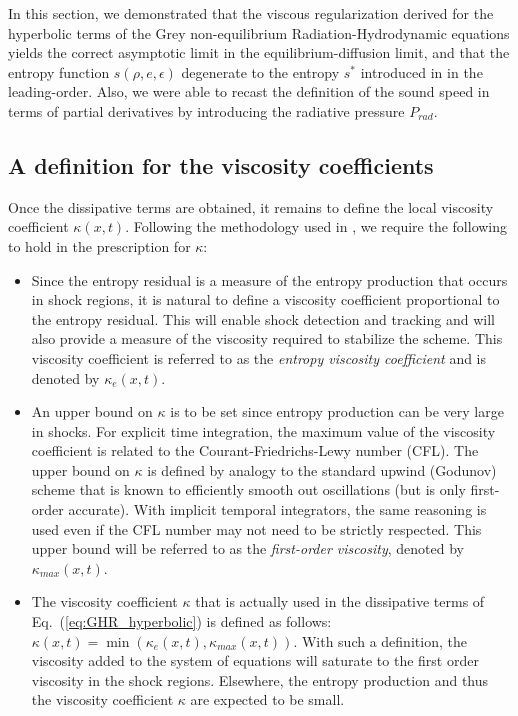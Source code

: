 \documentclass[review]{elsarticle}
\newcommand{\eqt}[1]{Eq.~(\ref{#1})}                     %
\begin{document}
In this section, we demonstrated that the viscous regularization derived for the hyperbolic terms of the Grey non-equilibrium Radiation-Hydrodynamic equations yields the correct asymptotic limit in the equilibrium-diffusion limit, and that the entropy function $s(\rho, e, \epsilon)$ degenerate to the entropy $s^*$ introduced in \cite{LowrieMorel} in the leading-order. Also, we were able to recast the definition of the sound speed in terms of partial derivatives by introducing the radiative pressure $P_{rad}$.

\subsection{A definition for the viscosity coefficients}
Once the dissipative terms are obtained, it remains to define the local viscosity coefficient $\kappa(x,t)$. Following the methodology used in \cite{jlg1, jlg2}, we require the following to hold in the prescription for $\kappa$:
\begin{itemize}
\item Since the entropy residual is a measure of the entropy production that occurs in shock regions, it is natural to define a viscosity coefficient proportional to the entropy residual. This will enable shock detection and tracking and will also provide a measure of the viscosity required to stabilize the scheme. This viscosity coefficient is referred to as the \emph{entropy viscosity coefficient} and is denoted by $\kappa_e(x,t)$.
\item An upper bound on $\kappa$ is to be set since entropy production can be very large in shocks. For explicit time integration, the maximum value of the viscosity coefficient is related to the Courant-Friedrichs-Lewy number (CFL). The upper bound on  $\kappa$  is defined by analogy to the standard upwind (Godunov) scheme that is known to efficiently smooth out oscillations (but is only first-order accurate). With implicit temporal integrators, the same reasoning is used even if the CFL number may not need to be strictly respected. This upper bound will be referred to as the \emph{first-order viscosity}, denoted by $\kappa_{max}(x,t)$.  
\item The viscosity coefficient $\kappa$ that is actually used in the dissipative terms of \eqt{eq:GHR_hyperbolic} is defined as follows: $\kappa(x,t) = \min ( \kappa_e(x,t), \kappa_{max}(x,t) )$. With such a definition, the viscosity added to the system of equations will saturate to the first order viscosity in the shock regions. Elsewhere, the entropy production and thus the viscosity coefficient $\kappa$ are expected to be small.
\end{itemize}
\end{document}
